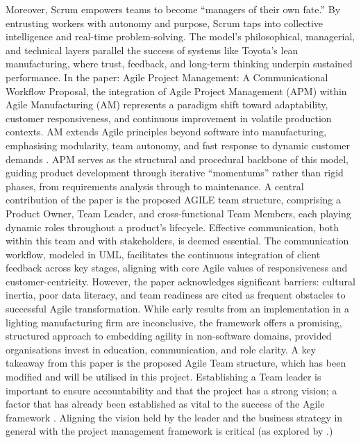 \documentclass{report}
\begin{document}
Moreover, Scrum empowers teams to become “managers of their own fate.” By entrusting workers with autonomy and purpose, Scrum taps into collective intelligence and real-time problem-solving. The model’s philosophical, managerial, and technical layers parallel the success of systems like Toyota's lean manufacturing, where trust, feedback, and long-term thinking underpin sustained performance.
In the paper: Agile Project Management: A Communicational Workflow Proposal, the integration of Agile Project Management (APM) within Agile Manufacturing (AM) represents a paradigm shift toward adaptability, customer responsiveness, and continuous improvement in volatile production contexts. AM extends Agile principles beyond software into manufacturing, emphasising modularity, team autonomy, and fast response to dynamic customer demands \parencite{loiroAgileProjectManagement2019}. APM serves as the structural and procedural backbone of this model, guiding product development through iterative “momentums” rather than rigid phases, from requirements analysis through to maintenance.
A central contribution of the paper is the proposed AGILE team structure, comprising a Product Owner, Team Leader, and cross-functional Team Members, each playing dynamic roles throughout a product’s lifecycle. Effective communication, both within this team and with stakeholders, is deemed essential. The communication workflow, modeled in UML, facilitates the continuous integration of client feedback across key stages, aligning with core Agile values of responsiveness and customer-centricity.
However, the paper acknowledges significant barriers: cultural inertia, poor data literacy, and team readiness are cited as frequent obstacles to successful Agile transformation. While early results from an implementation in a lighting manufacturing firm are inconclusive, the framework offers a promising, structured approach to embedding agility in non-software domains, provided organisations invest in education, communication, and role clarity.
A key takeaway from this paper is the proposed Agile Team structure, which has been modified and will be utilised in this project. Establishing a Team leader is important to ensure accountability and that the project has a strong vision; a factor that has already been established as vital to the success of the Agile framework \parencite{serradorDoesAgileWork2015}. Aligning the vision held by the leader and the business strategy in general with the project management framework is critical (as explored by \citeauthor{alsudiriAlignmentLargeProject2013}.) 
\end{document}
